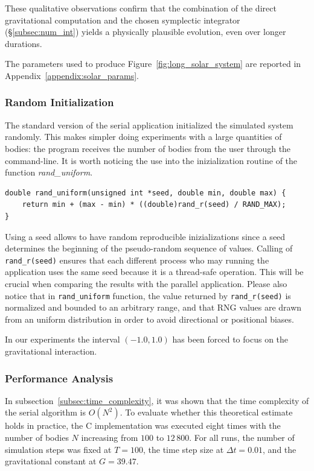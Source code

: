 \documentclass{article}
\begin{document}
These qualitative observations confirm that the combination of the direct gravitational computation and the chosen symplectic integrator (\S\ref{subsec:num_int}) yields a physically plausible evolution, even over longer durations.
  
The parameters used to produce Figure~\ref{fig:long_solar_system} are reported in Appendix~\ref{appendix:solar_params}.

\subsubsection{Random Initialization}
\label{subsec:random_init}
The standard version of the serial application initialized the simulated system randomly. This makes simpler doing experiments with a large quantities of bodies: the program receives the number of bodies from the user through the command-line.
It is worth noticing the use into the inizialization routine of the function \emph{rand\_uniform}.
\begin{lstlisting}
double rand_uniform(unsigned int *seed, double min, double max) {
    return min + (max - min) * ((double)rand_r(seed) / RAND_MAX);
}
\end{lstlisting}
Using a seed allows to have random reproducible inizializations since a seed determines the beginning of the pseudo-random sequence of values. Calling of \texttt{rand\_r(seed)} ensures that each different process who may running the application uses the same seed because it is a thread-safe operation. This will be crucial when comparing the results with the parallel application.
Please also notice that in \texttt{rand\_uniform} function, the value returned by \texttt{rand\_r(seed)} is normalized and bounded to an arbitrary range, and that RNG values are drawn from an uniform distribution in order to avoid directional or positional biases.

In our experiments the interval $\left(-1.0, 1.0\right)$ has been forced to focus on the gravitational interaction.


\subsubsection{Performance Analysis}
\label{subsec:performance_analysis}
In subsection~\ref{subsec:time_complexity}, it was shown that the time complexity of the serial algorithm is $O(N^2)$.  
To evaluate whether this theoretical estimate holds in practice, the C implementation was executed eight times with the number of bodies $N$ increasing from $100$ to $12\,800$.  
For all runs, the number of simulation steps was fixed at $T = 100$, the time step size at $\Delta t = 0.01$, and the gravitational constant at $G = 39.47$.  
\end{document}

